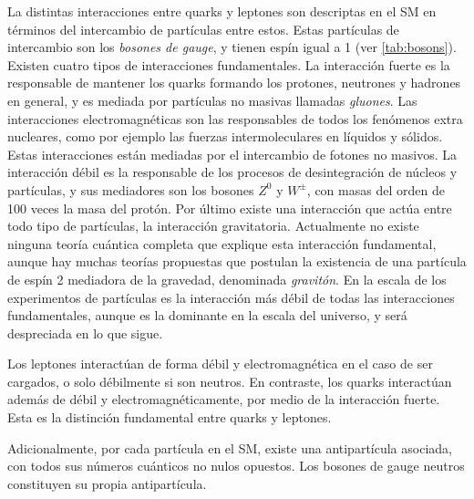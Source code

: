 La distintas interacciones entre quarks y leptones son descriptas en el SM en términos del
intercambio de partículas entre estos. Estas partículas de intercambio son
los \emph{bosones de gauge}, y tienen espín igual a 1 (ver \cref{tab:bosons}).
Existen cuatro tipos de interacciones fundamentales. La interacción fuerte es la
responsable de mantener los quarks formando los protones, neutrones y hadrones en general, y es
mediada por partículas no masivas llamadas \emph{gluones}. Las interacciones
electromagnéticas son las responsables de todos los fenómenos extra nucleares,
como por ejemplo las fuerzas intermoleculares en líquidos y sólidos. Estas
interacciones están mediadas por el intercambio de fotones no masivos. La
interacción débil es la responsable de los procesos de desintegración de núcleos y partículas, y
sus mediadores son los bosones $Z^0$ y $W^\pm$, con masas del orden de 100 veces
la masa del protón. Por último existe una interacción que actúa entre todo tipo
de partículas, la interacción gravitatoria. Actualmente no existe ninguna teoría
cuántica completa que explique esta interacción fundamental, aunque hay muchas
teorías propuestas que postulan la existencia de una partícula de espín 2 mediadora de
la gravedad, denominada \emph{gravitón}. En la escala de los experimentos
de partículas es la interacción más débil de todas las interacciones
fundamentales, aunque es la dominante en la escala del universo, y será despreciada
en lo que sigue.

Los leptones interactúan de forma débil y electromagnética en el caso de ser
cargados, o solo débilmente si son neutros. En contraste, los quarks
interactúan además de débil y electromagnéticamente, por medio de la
interacción fuerte. Esta es la distinción fundamental entre quarks y leptones.

Adicionalmente, por cada partícula en el SM, existe una antipartícula asociada, con todos
sus números cuánticos no nulos opuestos. Los bosones de gauge neutros constituyen su
propia antipartícula.


